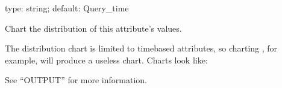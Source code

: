 \documentclass[letterpaper,10pt,english]{sphinxmanual}
\begin{document}
\begin{fulllineitems}
\label{\detokenize{mariadb-query-digest:cmdoption-mariadb-query-digest-report-histogram}}
type: string; default: Query\_time

Chart the distribution of this attribute’s values.

The distribution chart is limited to time\sphinxhyphen{}based attributes, so charting
, for example, will produce a useless chart.  Charts look
like:

\begin{sphinxVerbatim}[commandchars=\\\{\}]
\end{sphinxVerbatim}

See “OUTPUT” for more information.

\end{fulllineitems}

\end{document}
